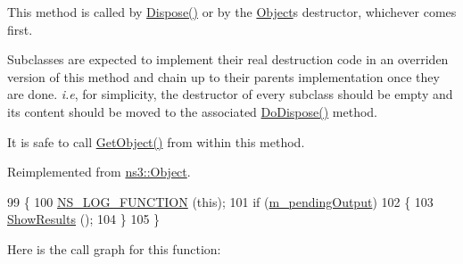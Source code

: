 This method is called by \hyperlink{classns3_1_1Object_aa90ae598863f6c251cdab3c3722afdaf}{Dispose()} or by the \hyperlink{classns3_1_1Object}{Object}\textquotesingle{}s destructor, whichever comes first.

Subclasses are expected to implement their real destruction code in an overriden version of this method and chain up to their parent\textquotesingle{}s implementation once they are done. {\itshape i.\+e}, for simplicity, the destructor of every subclass should be empty and its content should be moved to the associated \hyperlink{classns3_1_1RadioBearerStatsCalculator_a2640e8d96236a185e669ac795bc2c132}{Do\+Dispose()} method.

It is safe to call \hyperlink{classns3_1_1Object_a13e18c00017096c8381eb651d5bd0783}{Get\+Object()} from within this method. 

Reimplemented from \hyperlink{classns3_1_1Object_a475d429a75d302d4775f4ae32479b287}{ns3\+::\+Object}.


\begin{DoxyCode}
99 \{
100   \hyperlink{log-macros-disabled_8h_a90b90d5bad1f39cb1b64923ea94c0761}{NS\_LOG\_FUNCTION} (\textcolor{keyword}{this});
101   \textcolor{keywordflow}{if} (\hyperlink{classns3_1_1RadioBearerStatsCalculator_aeb0fc0f587b9d6e55e8e37de4cdb4059}{m\_pendingOutput})
102     \{
103       \hyperlink{classns3_1_1RadioBearerStatsCalculator_a78157d45a5b8dd3a1b054c72ea35442c}{ShowResults} ();
104     \}
105 \}
\end{DoxyCode}


Here is the call graph for this function\+:


